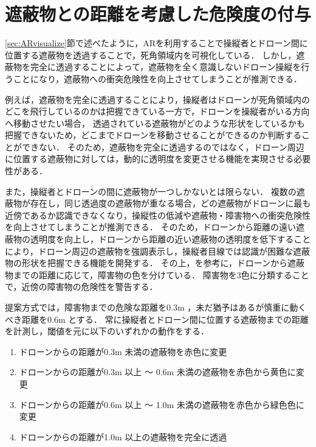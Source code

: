 \documentclass[a4paper,11pt]{ujreport}
\begin{document}
\section{遮蔽物との距離を考慮した危険度の付与}
\label{sec:DangerLevel}

\ref{sec:ARvisualize}節で述べたように，ARを利用することで操縦者とドローン間に位置する遮蔽物を透過することで，死角領域内を可視化している．
しかし，遮蔽物を完全に透過することによって，遮蔽物を全く意識しないドローン操縦を行うことになり，遮蔽物への衝突危険性を向上させてしまうことが推測できる．
\par
例えば，遮蔽物を完全に透過することにより，操縦者はドローンが死角領域内のどこを飛行しているのかは把握できている一方で，ドローンを操縦者がいる方向へ移動させたい場合，
透過されている遮蔽物がどのような形状をしているかも把握できないため，どこまでドローンを移動させることができるのか判断することができない．
そのため，遮蔽物を完全に透過するのではなく，ドローン周辺に位置する遮蔽物に対しては，動的に透明度を変更させる機能を実現させる必要性がある．

また，操縦者とドローンの間に遮蔽物が一つしかないとは限らない．
複数の遮蔽物が存在し，同じ透過度の遮蔽物が重なる場合，どの遮蔽物がドローンに最も近傍であるか認識できなくなり，操縦性の低減や遮蔽物・障害物への衝突危険性を向上させてしまうことが推測できる．
そのため，ドローンから距離の遠い遮蔽物の透明度を向上し，ドローンから距離の近い遮蔽物の透明度を低下することにより，ドローン周辺の遮蔽物を強調表示し，操縦者目線では認識が困難な遮蔽物の形状を把握できる機能を開発する．
その上，\cite{tech-01}を参考に，ドローンから遮蔽物までの距離に応じて，障害物の色を分けている．
障害物を3色に分類することで，近傍の障害物の危険性を警告する．
\par
提案方式では，障害物までの危険な距離を0.3m ，未だ猶予はあるが慎重に動くべき距離を0.6m とする．
常に操縦者とドローン間に位置する遮蔽物までの距離を計測し，閾値を元に以下のいずれかの動作をする．

\begin{enumerate}
	\item ドローンからの距離が0.3m 未満の遮蔽物を赤色に変更
    
  \item ドローンからの距離が0.3m 以上 〜 0.6m 未満の遮蔽物を赤色から黄色に変更
    
  \item ドローンからの距離が0.6m 以上 〜 1.0m 未満の遮蔽物を赤色から緑色色に変更
  
  \item ドローンからの距離が1.0m 以上の遮蔽物を完全に透過
\end{enumerate}
\end{document}
